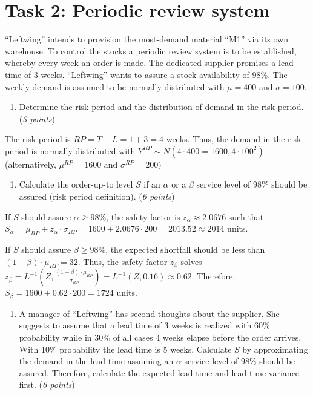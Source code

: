 \documentclass[
]{article}
\providecommand{\tightlist}{%
  \setlength{\itemsep}{0pt}\setlength{\parskip}{0pt}}
\begin{document}
\hypertarget{task-2-periodic-review-system}{%
\section{Task 2: Periodic review
system}\label{task-2-periodic-review-system}}

``Leftwing'' intends to provision the most-demand material ``M1'' via
its own warehouse. To control the stocks a periodic review system is to
be established, whereby every week an order is made. The dedicated
supplier promises a lead time of 3 weeks. ``Leftwing'' wants to assure a
stock availability of 98\%. The weekly demand is assumed to be normally
distributed with \(\mu = 400\) and \(\sigma = 100\).

\begin{enumerate}
\def\labelenumi{\arabic{enumi}.}
\tightlist
\item
  Determine the risk period and the distribution of demand in the risk
  period. (\emph{3 points})
\end{enumerate}

The risk period is \(RP = T + L = 1 + 3 = 4\) weeks. Thus, the demand in
the risk period is normally distributed with
\(Y^{RP} \sim N(4 \cdot 400= 1600, 4 \cdot 100^2 )\) (alternatively,
\(\mu^{RP} = 1600\) and \(\sigma^{RP} = 200\))

\begin{enumerate}
\def\labelenumi{\arabic{enumi}.}
\setcounter{enumi}{1}
\tightlist
\item
  Calculate the order-up-to level \(S\) if an \(\alpha\) or a \(\beta\)
  service level of 98\% should be assured (risk period definition).
  (\emph{6 points})
\end{enumerate}

If \(S\) should assure \(\alpha \geq 98\%\), the safety factor is
\(z_{\alpha} \approx 2.0676\) such that
\(S_{\alpha} = \mu_{RP} + z_{\alpha} \cdot \sigma_{RP} = 1600 + 2.0676 \cdot 200 = 2013.52 \approx 2014\)
units.

If \(S\) should assure \(\beta \geq 98\%\), the expected shortfall
should be less than \((1-\beta) \cdot \mu_{RP} = 32\). Thus, the safety
factor \(z_{\beta}\) solves
\(z_{\beta} = L^{-1}\left(Z, \frac{(1-\beta) \cdot \mu_{RP}}{\sigma_{RP}} \right) = L^{-1} (Z,0.16) \approx 0.62\).
Therefore, \(S_{\beta } = 1600 + 0.62 \cdot 200 = 1724\) units.

\begin{enumerate}
\def\labelenumi{\arabic{enumi}.}
\setcounter{enumi}{2}
\tightlist
\item
  A manager of ``Leftwing'' has second thoughts about the supplier. She
  suggests to assume that a lead time of 3 weeks is realized with 60\%
  probability while in 30\% of all cases 4 weeks elapse before the order
  arrives. With 10\% probability the lead time is 5 weeks. Calculate
  \(S\) by approximating the demand in the lead time assuming an
  \(\alpha\) service level of 98\% should be assured. Therefore,
  calculate the expected lead time and lead time variance first.
  (\emph{6 points})
\end{enumerate}
\end{document}
